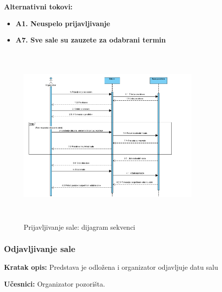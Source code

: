 \documentclass[a4paper]{article}
\begin{document}
\noindent\textbf{Alternativni tokovi:} 
\begin{itemize}
 \item \textbf{A1. Neuspelo prijavljivanje} 
  \item \textbf{A7. Sve sale su zauzete za odabrani termin} 
\end{itemize}
\begin{figure}[H]
  \begin{center}
      \includegraphics[width=90mm,height=90mm]{../images/sequence_prijavljivanje_sale.png}
  \end{center}
  \caption{Prijavljivanje sale: dijagram sekvenci}
  \label{sequence_prijavljivanje_sale}
\end{figure}
\subsubsection{Odjavljivanje sale}
\noindent\textbf{Kratak opis:} Predstava je odložena i organizator odjavljuje datu salu

\noindent\textbf{Učesnici:} Organizator pozorišta.
\end{document}
